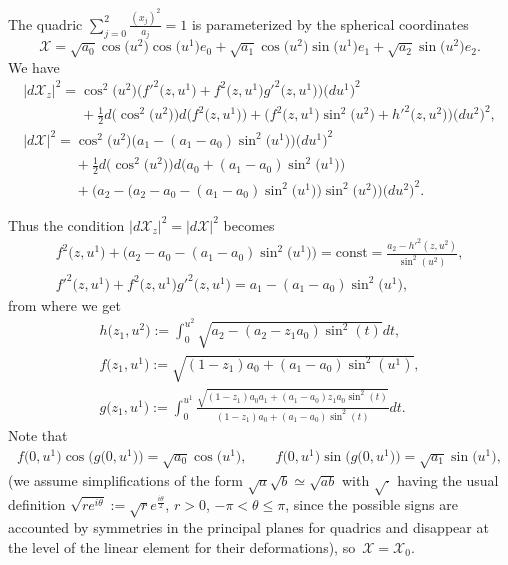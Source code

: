 The quadric $\sum\limits_{j=0}^2\frac{(x_j)^2}{a_j}=1$ is parameterized
by the spherical coordinates
\[
\mathcal{X}=\sqrt{a_0}\cos\big(u^2\big)\cos\big(u^1\big)e_0
+\sqrt{a_1}\cos\big(u^2\big)\sin\big(u^1\big)e_1+\sqrt{a_2}\sin\big(u^2\big)e_2.
\]
We have
\begin{gather*}
|d\mathcal{X}_z|^2=\cos^2\big(u^2\big)\big(f'^2\big(z,u^1\big)
+f^2\big(z,u^1\big)g'^2\big(z,u^1\big)\big)\big(du^1\big)^2
\\
\phantom{|d\mathcal{X}_z|^2=}{}
+\tfrac{1}{2}d\big(\cos^2\big(u^2\big)\big)d\big(f^2\big(z,u^1\big)\big)
+\big(f^2\big(z,u^1\big)\sin^2\big(u^2\big)+h'^2\big(z,u^2\big)\big)\big(du^2\big)^2,
\\
|d\mathcal{X}|^2
=\cos^2\big(u^2\big)\big(a_1-(a_1-a_0)\sin^2\big(u^1\big)\big)\big(du^1\big)^2\\
\phantom{|d\mathcal{X}|^2=}{}
+\tfrac{1}{2}d\big(\cos^2\big(u^2\big)\big)
d\big(a_0+(a_1-a_0)\sin^2\big(u^1\big)\big)
\\
\phantom{|d\mathcal{X}|^2=}{}
+\big(a_2-\big(a_2-a_0-(a_1-a_0)\sin^2\big(u^1\big)\big)\sin^2\big(u^2\big)\big)\big(du^2\big)^2.
\end{gather*}

Thus the condition $|d\mathcal{X}_z|^2=|d\mathcal{X}|^2$ becomes
\begin{gather*}
f^2\big(z,u^1\big)+\big(a_2-a_0-(a_1-a_0)\sin^2\big(u^1\big)\big)=\mathrm{const}=
\frac{a_2-h'^2(z,u^2)}{\sin^2(u^2)},
\\
f'^2\big(z,u^1\big)+f^2\big(z,u^1\big)g'^2\big(z,u^1\big)=a_1-(a_1-a_0)\sin^2\big(u^1\big),
\end{gather*}
from where we get
\begin{gather}
h\big(z_1,u^2\big):=\int_0^{u^2}\sqrt{a_2-(a_2-z_1a_0)\sin^2(t)}dt,\nonumber\\
f\big(z_1,u^1\big):=\sqrt{(1-z_1)a_0+(a_1-a_0)\sin^2(u^1)},\nonumber\\
g\big(z_1,u^1\big):=\int_0^{u^1}\frac{\sqrt{(1-z_1)a_0a_1+(a_1-a_0)z_1a_0\sin^2(t)}}
{(1-z_1)a_0+(a_1-a_0)\sin^2(t)}dt.\label{eq:fg}
\end{gather}
Note that
\begin{gather}
f\big(0,u^1\big)\cos\big(g\big(0,u^1\big)\big)=\sqrt{a_0}\cos\big(u^1\big),\qquad
f\big(0,u^1\big)\sin\big(g\big(0,u^1\big)\big)=\sqrt{a_1}\sin\big(u^1\big),\label{eq:fg0}
\end{gather}
(we assume simplif\/ications of the form
$\sqrt{a}\sqrt{b}\simeq\sqrt{ab}$ with $\sqrt{\cdot}$ having the
usual def\/inition
$\sqrt{re^{i\theta}}:=\sqrt{r}e^{\frac{i\theta}{2}}$, $r>0$,
$-\pi<\theta\le\pi$, since the possible signs are accounted by
symmetries in the principal planes for quadrics and disappear at
the level of the linear element for their deformations), so~$\mathcal{X}=\mathcal{X}_0$.

